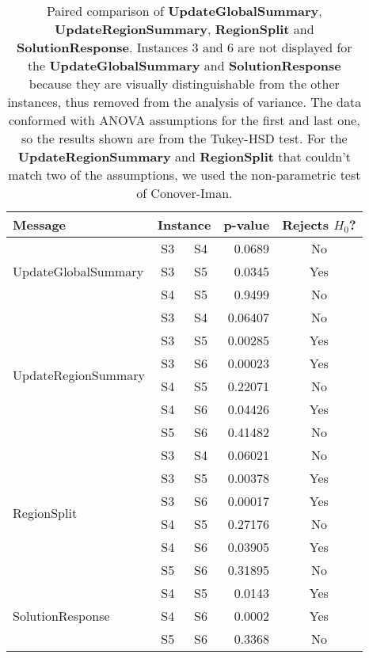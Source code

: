 \documentclass[preprint,12pt]{elsarticle}
\begin{document}
\begin{table}
    \centering
    \caption{Paired comparison of \textbf{UpdateGlobalSummary}, \textbf{UpdateRegionSummary}, \textbf{RegionSplit} and \textbf{SolutionResponse}. Instances 3 and 6 are not displayed for the \textbf{UpdateGlobalSummary} and \textbf{SolutionResponse} because they are visually distinguishable from the other instances, thus removed from the analysis of variance. The data conformed with ANOVA assumptions for the first and last one, so the results shown are from the Tukey-HSD test. For the \textbf{UpdateRegionSummary} and \textbf{RegionSplit} that couldn't match two of the assumptions, we used the non-parametric test of Conover-Iman.}
    \begin{tabular}{lccrc}
    \toprule
    \textbf{Message}    & \multicolumn{2}{c}{\textbf{Instance}} & \textbf{p-value}  & \textbf{Rejects $H_0$?} \\
    \midrule
    \multirow{3}{*}{UpdateGlobalSummary}    & S3   &  S4  & 0.0689 &  No \\
                                            & S3   &  S5  & 0.0345 &  Yes \\
                                            & S4   &  S5  & 0.9499 &  No \\
    \midrule
    \multirow{6}{*}{UpdateRegionSummary}    & S3 &    S4 &  0.06407 &  No  \\
                                            & S3 &    S5 &  0.00285 &  Yes \\
                                            & S3 &    S6 &  0.00023 &  Yes \\
                                            & S4 &    S5 &  0.22071 &  No  \\
                                            & S4 &    S6 &  0.04426 &  Yes \\
                                            & S5 &    S6 &  0.41482 &  No  \\
    \midrule
    \multirow{6}{*}{RegionSplit}    & S3  &  S4  &  0.06021  &  No \\
                                    & S3  &  S5  &  0.00378  &  Yes \\
                                    & S3  &  S6  &  0.00017  &  Yes \\
                                    & S4  &  S5  &  0.27176  &  No \\
                                    & S4  &  S6  &  0.03905  &  Yes \\
                                    & S5  &  S6  &  0.31895  &  No \\
    \midrule
    \multirow{3}{*}{SolutionResponse}   & S4  &  S5 &  0.0143 & Yes \\
                                        & S4  &  S6 &  0.0002 & Yes  \\
                                        & S5  &  S6 &  0.3368 & No \\
    \bottomrule
    \end{tabular}
    \label{tab:multicomp_results}
\end{table}
\end{document}
